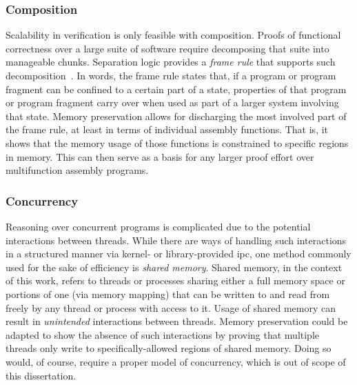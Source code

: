 \subsubsection{Composition}\label{sse:composition}
Scalability in verification is only feasible with composition.
Proofs of functional correctness over a large suite of software
require decomposing that suite into manageable chunks.
Separation logic provides a \emph{frame rule} that supports such%
%
decomposition~\citep{o2001local,reynolds2002separation,krebbers2017essence}.
In words, the frame rule states that,
if a program or program fragment can be confined to a certain part of a state,
properties of that program or program fragment carry over
when used as part of a larger system involving that state.
Memory preservation allows for discharging the most involved part of the frame rule,
at least in terms of individual assembly functions.
That is, it shows that the memory usage of those functions is constrained
to specific regions in memory.
This can then serve as a basis
for any larger proof effort over multifunction assembly programs.

\subsubsection{Concurrency}
Reasoning over concurrent programs is complicated
due to the potential interactions between threads.
While there are ways of handling such interactions in a structured manner
via kernel- or library-provided \ac{ipc},
one method commonly used for the sake of efficiency is \emph{shared memory}.
Shared memory, in the context of this work,
refers to threads or processes sharing either a full memory space
or portions of one (via memory mapping)
that can be written to and read from freely by any thread or process with access to it.
Usage of shared memory can result in \emph{unintended} interactions between threads.
Memory preservation could be adapted to show the absence of such interactions
by proving that multiple threads only write
to specifically-allowed regions of shared memory.
Doing so would, of course, require a proper model of concurrency,
which is out of scope of this dissertation.

